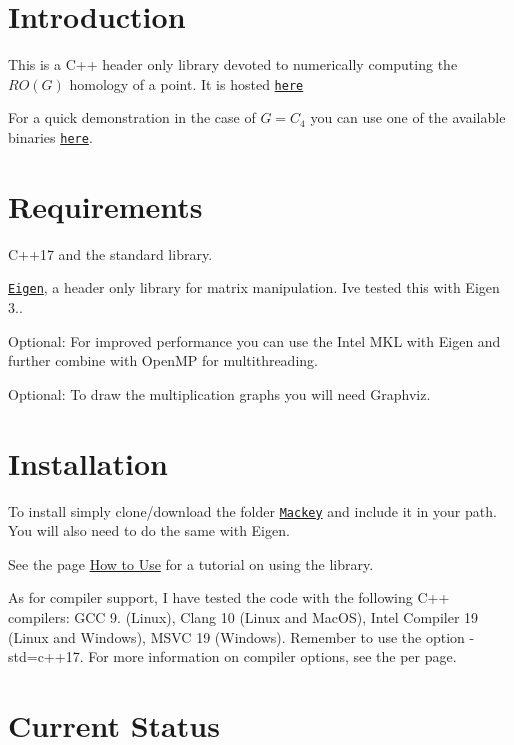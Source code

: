 \hypertarget{index_intro}{}\section{Introduction}\label{index_intro}
This is a C++ header only library devoted to numerically computing the $RO(G)$ homology of a point. It is hosted \href{https://github.com/NickG-Math/Mackey}{\tt here}

For a quick demonstration in the case of $G=C_4$ you can use one of the available binaries \href{https://github.com/NickG-Math/Mackey/Exec}{\tt here}.\hypertarget{index_req}{}\section{Requirements}\label{index_req}

\begin{DoxyItemize}
\item C++17 and the standard library.
\item \href{ http://eigen.tuxfamily.org/index.php?title=Main_Page}{\tt Eigen}, a header only library for matrix manipulation. I\textquotesingle{}ve tested this with Eigen 3..
\item Optional\+: For improved performance you can use the Intel M\+KL with Eigen and further combine with Open\+MP for multithreading.
\item Optional\+: To draw the multiplication graphs you will need Graphviz.
\end{DoxyItemize}\hypertarget{index_install}{}\section{Installation}\label{index_install}

\begin{DoxyItemize}
\item To install simply clone/download the folder \href{https://github.com/NickG-Math/Mackey/Mackey}{\tt Mackey} and include it in your path. You will also need to do the same with Eigen.
\item See the page \hyperlink{use}{How to Use} for a tutorial on using the library.
\item As for compiler support, I have tested the code with the following C++ compilers\+: G\+CC 9. (Linux), Clang 10 (Linux and Mac\+OS), Intel Compiler 19 (Linux and Windows), M\+S\+VC 19 (Windows). Remember to use the option {\ttfamily -\/std=c++17}. For more information on compiler options, see the per page.
\end{DoxyItemize}\hypertarget{index_status}{}\section{Current Status}\label{index_status}

